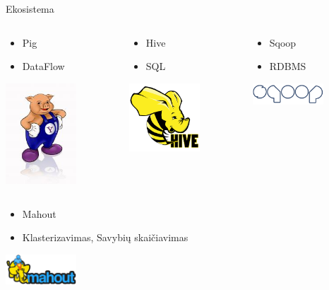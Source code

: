 \documentclass{beamer}
\begin{document}
  \begin{frame}[allowframebreaks=0.8]{Ekosistema}
    \begin{columns}
      \begin{column}{0.3\textwidth}
        \begin{itemize}
          \item Pig
          \item DataFlow
        \end{itemize}
        \includegraphics[width=100px]{img/yahoopig.jpeg}
      \end{column}
      \begin{column}{0.3\textwidth}
        \begin{itemize}
          \item Hive
          \item SQL
        \end{itemize}
        \includegraphics[width=100px]{img/hive.png}
        \vspace{45px}
      \end{column}
      \begin{column}{0.3\textwidth}
        \begin{itemize}
          \item Sqoop
          \item RDBMS
        \end{itemize}
        \includegraphics[width=100px]{img/sqoop.png}
        \vspace{110px}
      \end{column}
    \end{columns}

    \begin{itemize}
      \item Mahout
      \item Klasterizavimas, Savybių skaičiavimas
    \end{itemize}
    \begin{center}
      \includegraphics[width=100px]{img/mahout_logo.png}
    \end{center}


\end{frame}
\end{document}
